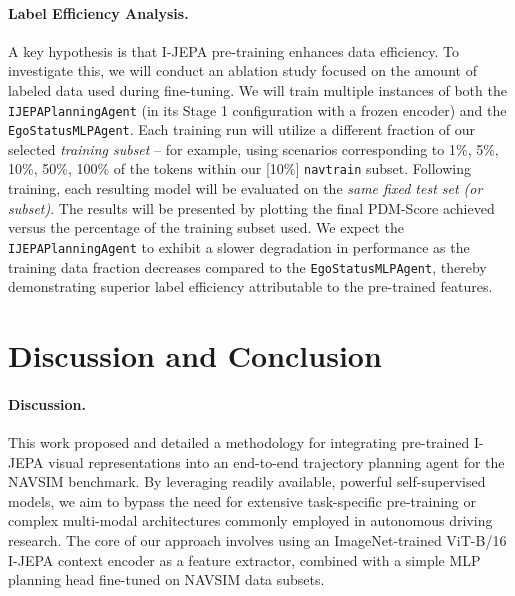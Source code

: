 \documentclass{article}
\begin{document}
\paragraph{Label Efficiency Analysis.}
A key hypothesis is that I-JEPA pre-training enhances data efficiency. To investigate this, we will conduct an ablation study focused on the amount of labeled data used during fine-tuning. We will train multiple instances of both the \texttt{IJEPAPlanningAgent} (in its Stage 1 configuration with a frozen encoder) and the \texttt{EgoStatusMLPAgent}. Each training run will utilize a different fraction of our selected \textit{training subset} – for example, using scenarios corresponding to {1\%, 5\%, 10\%, 50\%, 100\%} of the tokens within our [10\%] \texttt{navtrain} subset. Following training, each resulting model will be evaluated on the \textit{same fixed test set (or subset)}. The results will be presented by plotting the final PDM-Score achieved versus the percentage of the training subset used. We expect the \texttt{IJEPAPlanningAgent} to exhibit a slower degradation in performance as the training data fraction decreases compared to the \texttt{EgoStatusMLPAgent}, thereby demonstrating superior label efficiency attributable to the pre-trained features.


\section{Discussion and Conclusion}
\label{sec:conclusion}

\paragraph{Discussion.}
This work proposed and detailed a methodology for integrating pre-trained I-JEPA visual representations into an end-to-end trajectory planning agent for the NAVSIM benchmark. By leveraging readily available, powerful self-supervised models, we aim to bypass the need for extensive task-specific pre-training or complex multi-modal architectures commonly employed in autonomous driving research. The core of our approach involves using an ImageNet-trained ViT-B/16 I-JEPA context encoder as a feature extractor, combined with a simple MLP planning head fine-tuned on NAVSIM data subsets.
\end{document}

